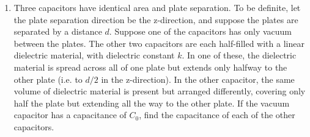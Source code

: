 \documentclass[fleqn]{article}
\begin{document}
\begin{enumerate}
    \item Three capacitors have identical area and plate separation. To be definite, let the plate separation direction be 
    the z-direction, and suppose the plates are separated by a distance $d$. Suppose one of the capacitors has only vacuum between the plates. The other two capacitors are
    each half-filled with a linear dielectric material, with dielectric constant $k$. In one of these, the dielectric material is 
    spread across all of one plate but extends only halfway to the other plate (i.e. to $d/2$ in the z-direction). In the other 
    capacitor, the same volume of dielectric material is present but arranged differently, covering only half the plate
    but extending all the way to the other plate. If the vacuum capacitor has a capacitance of $C_0$, find the capacitance of each 
    of the other capacitors.


  \end{enumerate}
\end{document}
